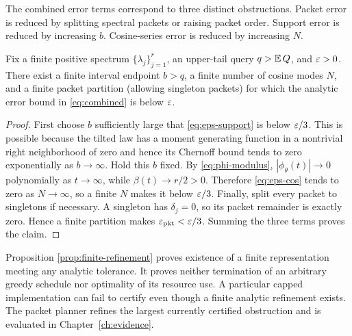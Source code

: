 The combined error terms correspond to three distinct obstructions. Packet error is reduced by splitting spectral packets or raising packet order. Support error is reduced by increasing $b$. Cosine-series error is reduced by increasing $N$.

\begin{proposition}
\label{prop:finite-refinement}
Fix a finite positive spectrum $\{\lambda_j\}_{j=1}^{r}$, an upper-tail query $q>\operatorname{\mathbb E} Q$, and $\varepsilon>0$. There exist a finite interval endpoint $b>q$, a finite number of cosine modes $N$, and a finite packet partition (allowing singleton packets) for which the analytic error bound in \eqref{eq:combined} is below $\varepsilon$.
\end{proposition}

\begin{proof}
First choose $b$ sufficiently large that \eqref{eq:eps-support} is below $\varepsilon/3$. This is possible because the tilted law has a moment generating function in a nontrivial right neighborhood of zero and hence its Chernoff bound tends to zero exponentially as $b\to\infty$. Hold this $b$ fixed. By \eqref{eq:phi-modulus}, $|\phi_{\theta}(t)|\to0$ polynomially as $t\to\infty$, while $\beta(t)\to r/2>0$. Therefore \eqref{eq:eps-cos} tends to zero as $N\to\infty$, so a finite $N$ makes it below $\varepsilon/3$. Finally, split every packet to singletons if necessary. A singleton has $\delta_j=0$, so its packet remainder is exactly zero. Hence a finite partition makes $\varepsilon_{\mathrm{pkt}}<\varepsilon/3$. Summing the three terms proves the claim.
\end{proof}

\begin{remark}\label{claim:final-26-14}
Proposition \ref{prop:finite-refinement} proves existence of a finite representation meeting any analytic tolerance. It proves neither termination of an arbitrary greedy schedule nor optimality of its resource use. A particular capped implementation can fail to certify even though a finite analytic refinement exists. The packet planner refines the largest currently certified obstruction and is evaluated in Chapter~\ref{ch:evidence}.
\end{remark}


